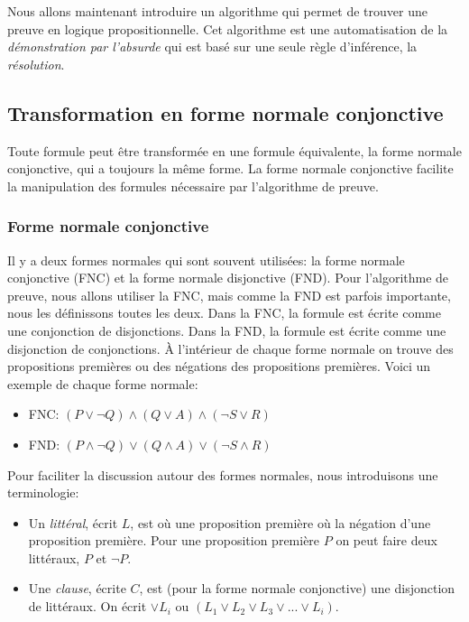 Nous allons maintenant introduire un algorithme qui permet de trouver
une preuve en logique propositionnelle.
Cet algorithme est une automatisation de la {\em démonstration par l'absurde}
qui est basé sur une seule règle d'inférence, la {\em résolution}.

\subsection{Transformation en forme normale conjonctive}
\label{fnc}

Toute formule peut être transformée en une formule équivalente, la forme normale conjonctive,
qui a toujours la même forme.
La forme normale conjonctive facilite la manipulation des formules nécessaire
par l'algorithme de preuve.

\subsubsection{Forme normale conjonctive}

Il y a deux formes normales qui sont souvent utilisées:
la forme normale conjonctive (FNC) et la forme normale disjonctive (FND).
Pour l'algorithme de preuve, nous allons utiliser la FNC, mais comme la FND est parfois importante,
nous les définissons toutes les deux.
Dans la FNC, la formule est écrite comme une conjonction de disjonctions.
Dans la FND, la formule est écrite comme une disjonction de conjonctions.
À l'intérieur de chaque forme normale on trouve des propositions premières ou des négations des propositions premières.
Voici un exemple de chaque forme normale:
\begin{itemize}
  \item FNC: $( P \lor \lnot Q ) \land ( Q \lor A ) \land ( \lnot S \lor R )$  
  \item FND: $( P \land \lnot Q ) \lor ( Q \land A ) \lor ( \lnot S \land R )$  
\end{itemize}
Pour faciliter la discussion autour des formes normales, nous introduisons une terminologie:
\begin{itemize}
\item Un {\em littéral}, écrit $L$, est où une proposition première où la négation d'une proposition première.
Pour une proposition première $P$ on peut faire deux littéraux,
$P$ et $\lnot P$.
\item Une {\em clause}, écrite $C$, est (pour la forme normale conjonctive) une disjonction de littéraux.
On écrit $\lor L_i$ ou $( L_1 \lor L_2 \lor L_3 \lor ... \lor L_i )$.
\end{itemize}

